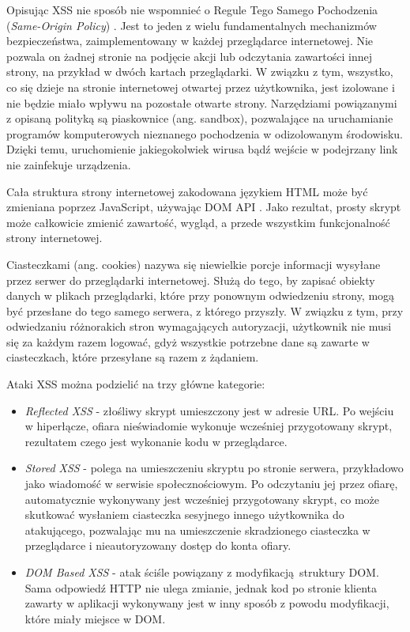 \documentclass[12pt,twoside]{article}
\begin{document}
Opisując XSS nie sposób nie wspomnieć o Regule Tego Samego Pochodzenia (\emph{Same-Origin Policy}) \cite{SameOriginPolicy}. Jest to jeden z wielu fundamentalnych mechanizmów bezpieczeństwa, zaimplementowany w każdej przeglądarce internetowej. Nie pozwala on żadnej stronie na podjęcie akcji lub odczytania zawartości innej strony, na przykład w dwóch kartach przeglądarki. W związku z tym, wszystko, co się dzieje na stronie internetowej otwartej przez użytkownika, jest izolowane i nie będzie miało wpływu na pozostałe otwarte strony. Narzędziami powiązanymi z opisaną polityką są piaskownice (ang. sandbox), pozwalające na uruchamianie programów komputerowych nieznanego pochodzenia w odizolowanym środowisku. Dzięki temu, uruchomienie jakiegokolwiek wirusa bądź wejście w podejrzany link nie zainfekuje urządzenia.
	
	Cała struktura strony internetowej zakodowana językiem HTML może być zmieniana poprzez JavaScript, używając DOM API \cite{DOM}. Jako rezultat, prosty skrypt może całkowicie zmienić zawartość, wygląd, a przede wszystkim funkcjonalność strony internetowej.
	
	Ciasteczkami (ang. cookies) \cite{Cookies} nazywa się niewielkie porcje informacji wysyłane przez serwer do przeglądarki internetowej. Służą do tego, by zapisać obiekty danych w plikach przeglądarki, które przy ponownym odwiedzeniu strony, mogą być przesłane do tego samego serwera, z którego przyszły. W związku z tym, przy odwiedzaniu różnorakich stron wymagających autoryzacji, użytkownik nie musi się za każdym razem logować, gdyż wszystkie potrzebne dane są zawarte w ciasteczkach, które przesyłane są razem z żądaniem. 
	
	Ataki XSS można podzielić na trzy główne kategorie:
	
	\begin{itemize}
		\item \emph{Reflected XSS} - złośliwy skrypt umieszczony jest w adresie URL. Po wejściu w hiperłącze, ofiara nieświadomie wykonuje wcześniej przygotowany skrypt, rezultatem czego jest wykonanie kodu w przeglądarce.
		\item \emph{Stored XSS} - polega na umieszczeniu skryptu po stronie serwera, przykładowo jako wiadomość w serwisie społecznościowym. Po odczytaniu jej przez ofiarę, automatycznie wykonywany jest wcześniej przygotowany skrypt, co może skutkować wysłaniem ciasteczka sesyjnego innego użytkownika do atakującego, pozwalając mu na umieszczenie skradzionego ciasteczka w przeglądarce i nieautoryzowany dostęp do konta ofiary.
		\item \emph{DOM Based XSS} - atak ściśle powiązany z modyfikacją struktury DOM. Sama odpowiedź HTTP nie ulega zmianie, jednak kod po stronie klienta zawarty w aplikacji wykonywany jest w inny sposób z powodu modyfikacji, które miały miejsce w DOM.
	\end{itemize}
	
\end{document}
